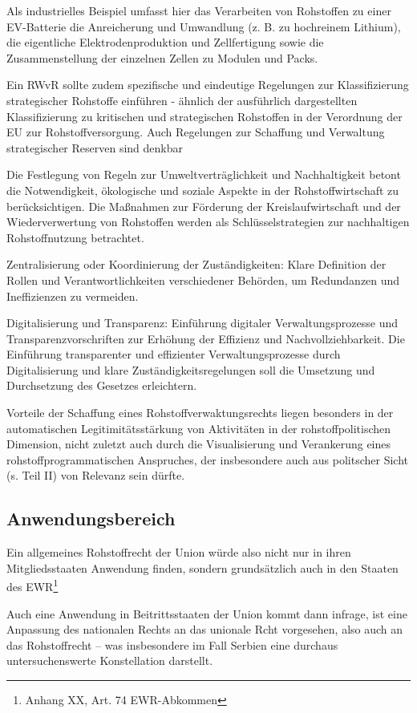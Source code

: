 \documentclass[12pt,a4paper,oneside]{book} %
\begin{document}
Als industrielles Beispiel umfasst hier das Verarbeiten von Rohstoffen zu einer EV-Batterie die Anreicherung und Umwandlung (z. B. zu hochreinem Lithium), die eigentliche Elektrodenproduktion und Zellfertigung sowie die Zusammenstellung der einzelnen Zellen zu Modulen und Packs.

Ein RWvR sollte zudem spezifische und eindeutige Regelungen zur Klassifizierung strategischer Rohstoffe einführen - ähnlich der ausführlich dargestellten Klassifizierung zu kritischen und strategischen Rohstoffen in der Verordnung der EU zur Rohstoffversorgung. Auch Regelungen zur Schaffung und Verwaltung strategischer Reserven sind denkbar  %

Die Festlegung von Regeln zur Umweltverträglichkeit und Nachhaltigkeit betont die Notwendigkeit, ökologische und soziale Aspekte in der Rohstoffwirtschaft zu berücksichtigen.
Die Maßnahmen zur Förderung der Kreislaufwirtschaft und der Wiederverwertung von Rohstoffen werden als Schlüsselstrategien zur nachhaltigen Rohstoffnutzung betrachtet.

Zentralisierung oder Koordinierung der Zuständigkeiten: Klare Definition der Rollen und Verantwortlichkeiten verschiedener Behörden, um Redundanzen und Ineffizienzen zu vermeiden.

Digitalisierung und Transparenz: Einführung digitaler Verwaltungsprozesse und Transparenzvorschriften zur Erhöhung der Effizienz und Nachvollziehbarkeit.
Die Einführung transparenter und effizienter Verwaltungsprozesse durch Digitalisierung und klare Zuständigkeitsregelungen soll die Umsetzung und Durchsetzung des Gesetzes erleichtern.

Vorteile der Schaffung eines Rohstoffverwaktungsrechts liegen besonders in der automatischen Legitimitätsstärkung von Aktivitäten in der rohstoffpolitischen Dimension, nicht zuletzt auch durch die Visualisierung und Verankerung eines rohstoffprogrammatischen Anspruches, der insbesondere auch aus politscher Sicht (s. Teil II) von Relevanz sein dürfte.

\subsection{Anwendungsbereich}

Ein allgemeines Rohstoffrecht der Union würde also nicht nur in ihren Mitgliedsstaaten Anwendung finden, sondern grundsätzlich auch in den Staaten des EWR\footnote{Anhang XX, Art. 74 EWR-Abkommen}


Auch eine Anwendung in Beitrittsstaaten der Union kommt dann infrage, ist eine Anpassung des nationalen Rechts an das unionale Rcht vorgesehen, also auch an das Rohstoffrecht -- was insbesondere im Fall Serbien eine durchaus untersuchenswerte Konstellation darstellt.
\end{document}
